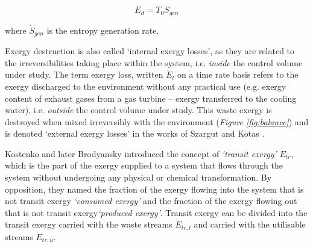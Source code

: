 \documentclass[times,3p]{elsarticle}
\begin{document}
	
	\begin{equation}
		\dot{E}_d=T_0\dot{S}_{gen}
	\end{equation}
	
	where $\dot{S}_{gen}$ is the entropy generation rate.

Exergy destruction is also called `internal exergy losses', as they are related to the irreversibilities taking place within the system, i.e. \emph{inside} the control volume under study. The term exergy loss, written $\dot{E}_l$ on a time rate basis \cite{BejanAdrian;TsatsaronisGeorge;Moran1996} refers to the exergy discharged to the environment without any practical use (e.g. exergy content of exhaust gases from a gas turbine -- exergy transferred to the cooling water), i.e. \emph{outside} the control volume under study. This waste exergy is destroyed when mixed irreversibly with the environment (\emph{Figure \ref{fig:balance}}) and is denoted `external exergy losses' in the works of Szargut and Kotas \cite{Szargut1998,Kotas1995}. 

Kostenko \cite{Kostenko1983} and later Brodyansky \cite{Brodyansky1994} introduced the concept of \emph{`transit exergy'} $\dot{E}_{tr}$, which is the part of the exergy supplied to a system that flows through the system without undergoing any physical or chemical transformation. By opposition, they named the fraction of the exergy flowing into the system that is not transit exergy \emph{`consumed exergy'} and the fraction of the exergy flowing out that is not transit exergy\emph{`produced exergy'}. Transit exergy can be divided into the transit exergy carried with the waste streams $\dot{E}_{tr,l}$ and carried with the utilisable streams $\dot{E}_{tr,u}$. 
\end{document}
